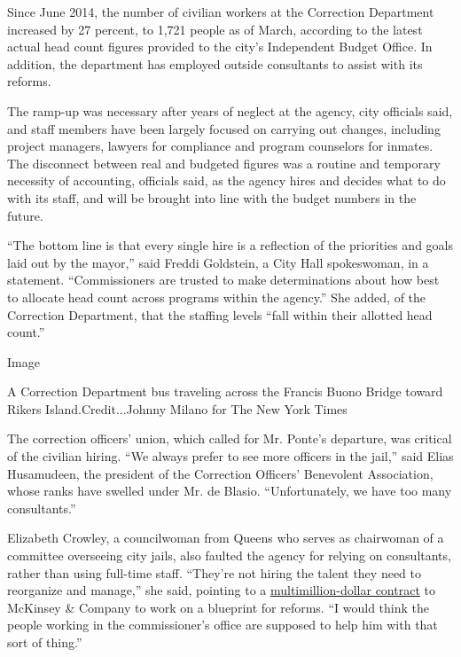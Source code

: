 Since June 2014, the number of civilian workers at the Correction
Department increased by 27 percent, to 1,721 people as of March,
according to the latest actual head count figures provided to the city's
Independent Budget Office. In addition, the department has employed
outside consultants to assist with its reforms.

The ramp-up was necessary after years of neglect at the agency, city
officials said, and staff members have been largely focused on carrying
out changes, including project managers, lawyers for compliance and
program counselors for inmates. The disconnect between real and budgeted
figures was a routine and temporary necessity of accounting, officials
said, as the agency hires and decides what to do with its staff, and
will be brought into line with the budget numbers in the future.

``The bottom line is that every single hire is a reflection of the
priorities and goals laid out by the mayor,'' said Freddi Goldstein, a
City Hall spokeswoman, in a statement. ``Commissioners are trusted to
make determinations about how best to allocate head count across
programs within the agency.'' She added, of the Correction Department,
that the staffing levels ``fall within their allotted head count.''

Image

A Correction Department bus traveling across the Francis Buono Bridge
toward Rikers Island.Credit...Johnny Milano for The New York Times

The correction officers' union, which called for Mr. Ponte's departure,
was critical of the civilian hiring. ``We always prefer to see more
officers in the jail,'' said Elias Husamudeen, the president of the
Correction Officers' Benevolent Association, whose ranks have swelled
under Mr. de Blasio. ``Unfortunately, we have too many consultants.''

Elizabeth Crowley, a councilwoman from Queens who serves as chairwoman
of a committee overseeing city jails, also faulted the agency for
relying on consultants, rather than using full-time staff. ``They're not
hiring the talent they need to reorganize and manage,'' she said,
pointing to a
\href{https://www.nytimes3xbfgragh.onion/2016/01/26/nyregion/consultant-gets-7-million-more-to-plan-reform-at-rikers-jails.html}{multimillion-dollar
contract} to McKinsey \& Company to work on a blueprint for reforms. ``I
would think the people working in the commissioner's office are supposed
to help him with that sort of thing.''

